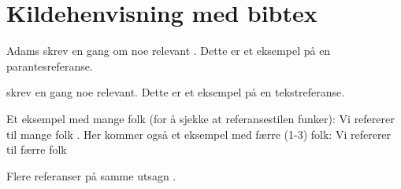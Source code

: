 
\section{Kildehenvisning med bibtex}
Adams skrev en gang om noe relevant \citep[s.123]{adams1995}. Dette er et eksempel på en parantesreferanse.

\citet{adams1995} skrev en gang noe relevant. Dette er et eksempel på en tekstreferanse.

Et eksempel med mange folk (for å sjekke at referansestilen funker): Vi refererer til mange folk \citep{mangefolk}. Her kommer også et eksempel med færre (1-3) folk: Vi refererer til færre folk \citep{faafolk}

Flere referanser på samme utsagn \citep{faafolk,adams1995}.


